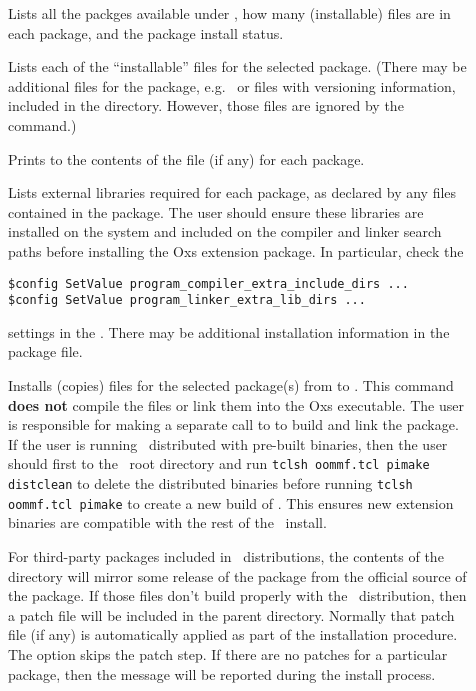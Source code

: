 \begin{description}
\item[]
  Lists all the packges available under
  , how many (installable) files are in
  each package, and the package install status.
\item[]
  Lists each of the ``installable'' files for the selected package.
  (There may be additional files for the package, e.g.\  or
  files with versioning information, included in the
   directory.  However, those
  files are ignored by the  command.)
\item[]
  Prints to  the contents of the  file (if any)
  for each package.
\item[]
  Lists external libraries required for each package, as declared by any
   files contained in the package. The user should ensure
  these libraries are installed on the system and included on the
  compiler and linker search paths before installing the Oxs extension
  package. In particular, check the
\begin{verbatim}
$config SetValue program_compiler_extra_include_dirs ...
$config SetValue program_linker_extra_lib_dirs ...
\end{verbatim}
settings in the .  There may be
additional installation information in the package  file.

\item[]
  Installs (copies) files for the selected package(s) from
   to .  This
  command \textbf{does not} compile the files or link them into the Oxs
  executable.  The user is responsible for making a separate call to
   to build and link the
  package. If the user is running \OOMMF\ distributed with pre-built
  binaries, then the user should first  to the \OOMMF\ root
  directory and run
  \verb+tclsh oommf.tcl pimake distclean+
  to delete the distributed binaries before running
  \verb+tclsh oommf.tcl pimake+ to create a new build of \OOMMF. This
  ensures  new extension binaries are compatible with the rest of
  the \OOMMF\ install.

  For third-party packages included in \OOMMF\ distributions, the
  contents of the directory 
  will mirror some release of the package from the official source of
  the package.  If those files don't build properly with the
  \OOMMF\ distribution, then a patch file will be included in the parent
   directory.  Normally that patch file (if
  any) is automatically applied as part of the installation procedure.
  The  option skips the patch step. If there are no patches
  for a particular package, then the message  will
  be reported during the install process.


\end{description}
